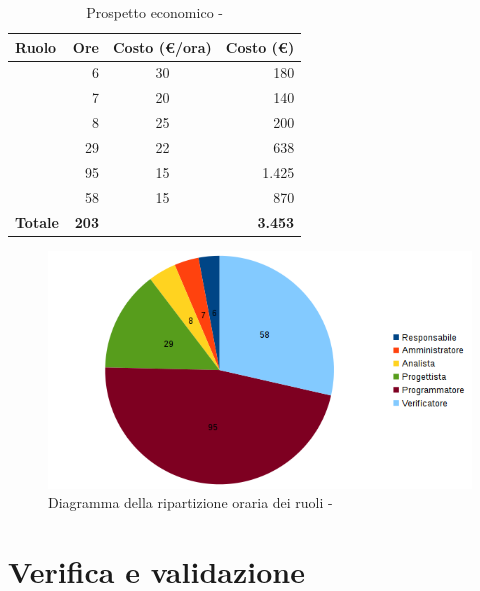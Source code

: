 \documentclass[12pt,a4paper]{article}
\begin{document}
\begin{table}[H]
	\begin{center}
		\begin{tabular}{l r c r}
			\toprule
			\textbf{Ruolo}	& \textbf{Ore} & \textbf{Costo (\euro/ora)}	& \textbf{Costo (\euro)} \\ \midrule
			\midrule
			\RE & 6 & 30 & 180 \\ \midrule
			\AM & 7 & 20 & 140 \\ \midrule
			\AN & 8 & 25 & 200 \\ \midrule
			\PG & 29 & 22 & 638 \\ \midrule
			\PR & 95 & 15 & 1.425 \\ \midrule
			\VR & 58 & 15 & 870 \\ \midrule
			\textbf{Totale} & \textbf{203} &  & \textbf{3.453} \\
			\bottomrule
		\end{tabular}
		\caption{Prospetto economico - \FPDC}
	\end{center}
\end{table}

\begin{center}
	\begin{figure}[H]
		\centering
		\includegraphics[width=\textwidth]{diagrammaTortaProgettazioneDettaglioCodificaTotaleOre.png}
		\caption{Diagramma della ripartizione oraria dei ruoli - \FPDC}
	\end{figure}
\end{center}

\newpage
\section{Verifica e validazione} %
\end{document}
